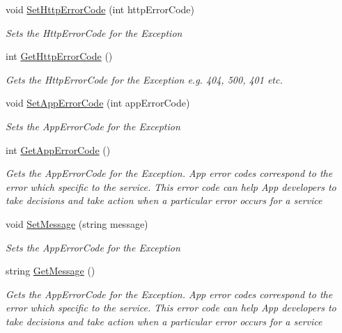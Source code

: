 \begin{DoxyCompactItemize}
\item 
void \hyperlink{classcom_1_1shephertz_1_1app42_1_1paas_1_1sdk_1_1csharp_1_1_app42_exception_aef55d0252b0e9b42a1592411e72ded73}{Set\+Http\+Error\+Code} (int http\+Error\+Code)
\begin{DoxyCompactList}\small\item\em Sets the Http\+Error\+Code for the Exception \end{DoxyCompactList}\item 
int \hyperlink{classcom_1_1shephertz_1_1app42_1_1paas_1_1sdk_1_1csharp_1_1_app42_exception_ad6c306cde64e91ec0757f12c887f3d2d}{Get\+Http\+Error\+Code} ()
\begin{DoxyCompactList}\small\item\em Gets the Http\+Error\+Code for the Exception e.\+g. 404, 500, 401 etc. \end{DoxyCompactList}\item 
void \hyperlink{classcom_1_1shephertz_1_1app42_1_1paas_1_1sdk_1_1csharp_1_1_app42_exception_a6fcb496bdf38eb654551051c87b62c1e}{Set\+App\+Error\+Code} (int app\+Error\+Code)
\begin{DoxyCompactList}\small\item\em Sets the App\+Error\+Code for the Exception \end{DoxyCompactList}\item 
int \hyperlink{classcom_1_1shephertz_1_1app42_1_1paas_1_1sdk_1_1csharp_1_1_app42_exception_a73f090c519512afd5a772e4e6cfdfb2a}{Get\+App\+Error\+Code} ()
\begin{DoxyCompactList}\small\item\em Gets the App\+Error\+Code for the Exception. App error codes correspond to the error which specific to the service. This error code can help App developers to take decisions and take action when a particular error occurs for a service \end{DoxyCompactList}\item 
void \hyperlink{classcom_1_1shephertz_1_1app42_1_1paas_1_1sdk_1_1csharp_1_1_app42_exception_a674e9453affa77a4179c084cc70e2ad5}{Set\+Message} (string message)
\begin{DoxyCompactList}\small\item\em Sets the App\+Error\+Code for the Exception \end{DoxyCompactList}\item 
string \hyperlink{classcom_1_1shephertz_1_1app42_1_1paas_1_1sdk_1_1csharp_1_1_app42_exception_a754c9bb68b74ae857277665252c23579}{Get\+Message} ()
\begin{DoxyCompactList}\small\item\em Gets the App\+Error\+Code for the Exception. App error codes correspond to the error which specific to the service. This error code can help App developers to take decisions and take action when a particular error occurs for a service \end{DoxyCompactList}\end{DoxyCompactItemize}



